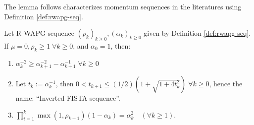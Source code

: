 \documentclass[12pt]{article}
\begin{document}
    The lemma follows characterizes momentum sequences in the literatures using Definition \ref{def:rwapg-seq}. 
    \begin{lemma}\label{lemma:inverted-fista-seq}
        Let R-WAPG sequence $(\rho_k)_{k \ge 0}, (\alpha_k)_{k \ge 0}$ given by Definition \ref{def:rwapg-seq}. 
        If $\mu = 0, \rho_k \ge 1\; \forall k \ge 0$, and $\alpha_0 = 1$, then: 
        \begin{enumerate}
            \item $\alpha_k^{-2} \ge \alpha_{k + 1}^{-2} - \alpha_{k + 1}^{-1}\; \forall k \ge 0$
            \item Let $t_k := \alpha_k^{-1}$, then $0 < t_{k + 1} \le (1/2)\left(1 + \sqrt{1 + 4t_k^2}\right)\;\forall k\ge 0$, hence the name: ``Inverted FISTA sequence''. 
            \item $\prod_{i = 1}^k\max(1, \rho_{k - 1})(1 - \alpha_k) = \alpha_k^2 \quad (\forall k \ge 1)$. 
        \end{enumerate}
    \end{lemma}
\end{document}
